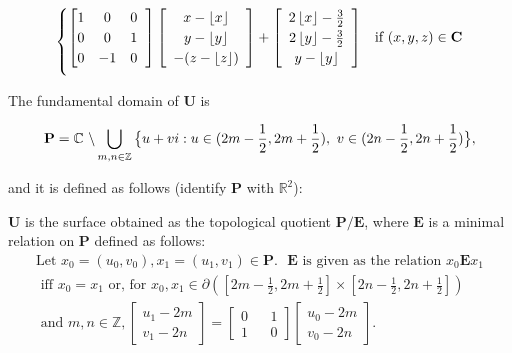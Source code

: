 \documentclass[]{article}
\begin{document}
\begin{equation}
\begin{cases}
		\left[ \begin{matrix}
		1 & 0 & 0 \\
		0 & 0 & 1 \\
		0 & -1 & 0
		\end{matrix}\hspace{2mm}\right]
		\left[\begin{array}{c}
			x - \left\lfloor x \right\rfloor
			\\ y- \left\lfloor y \right\rfloor
			\\ -(z - \left\lfloor z \right\rfloor)
			\end{array} \right]
		+
			\left[\begin{array}{c}
				2 \left\lfloor x \right\rfloor - \frac{3}{2}
				\\ 2\left\lfloor y \right\rfloor - \frac{3}{2}
				\\ y - \left\lfloor y \right\rfloor
			\end{array} \right]
				& \text{if } (x,y,z)\in \mathbf{C}	\vspace{2mm}
\end{cases}
\end{equation}


\noindent The fundamental domain of $\mathbf{U}$ is

\begin{equation}
\label{eq:P}
\mathbf{P} = \mathbb{C}\text{ }\backslash\bigcup_{m,n \in {\mathbb Z}} \big{\{} u+vi:u\in(2m-\frac{1}{2},2m+\frac{1}{2}),\text{ } v\in(2n-\frac{1}{2},2n+\frac{1}{2})\big{\}},
\end{equation}

\noindent and it is defined as follows (identify $\mathbf{P}$ with $\mathbb{R}^2$):

\begin{Def} $\mathbf U$ is the surface obtained as the topological quotient $\mathbf P/\mathbf{E}$, where $\mathbf E$ is a minimal relation on $\mathbf{P}$ defined as follows:
\begin{gather*}
\text{Let } x_{0}=(u_{0},v_{0}),x_{1}=(u_{1},v_{1}) \in \mathbf{P}.  \text{ }\mathbf{E} \text { is given as the relation } x_{0}\mathbf{E}x_{1} \\ \text{ iff } x_{0}=x_{1}
 \text{ or, for }x_{0},x_{1} \in {\partial} \left( \left[2m-\frac{1}{2},2m+\frac{1}{2}\right] \times \left[2n-\frac{1}{2},2n+\frac{1}{2}\right] \right)\\
 \text{ and }m,n\in\mathbb{Z},
  \left[\begin{array}{c}
u_{1} -2m
\\v_{1}-2n
\end{array}\right] = \left[\begin{matrix}
0 && 1\\
1 && 0
\end{matrix}\right]
\left[ \begin{array}{c}u_{0}-2m\\
v_{0}-2n
\end{array}\right]
. \end{gather*}
\end{Def}
\end{document}
